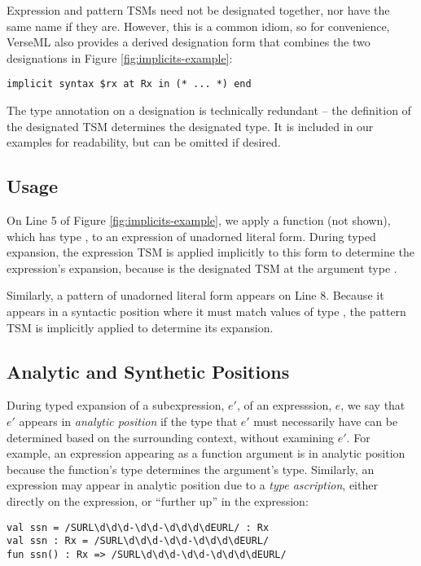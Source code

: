 Expression and pattern TSMs need not be designated together, nor have the same name if they are. However, this is a common idiom, so for convenience, VerseML also provides a derived designation form that combines the two designations in Figure \ref{fig:implicits-example}:
\begin{lstlisting}[numbers=none]
implicit syntax $rx at Rx in (* ... *) end 
\end{lstlisting}

The type annotation on a designation is technically redundant -- the definition of the designated TSM determines the designated type. It is included in our examples for readability, but can be omitted if desired.

\subsection{Usage}

On Line 5 of Figure \ref{fig:implicits-example}, we apply a function  (not shown), which has type , to an expression of unadorned literal form. During typed expansion, the expression TSM  is applied implicitly to this form to determine the expression's expansion,  because  is the designated TSM at the argument type . %

Similarly, a pattern of unadorned literal form appears on Line 8. Because it appears in a syntactic position where it must match values of type , the pattern TSM  is implicitly applied to determine its expansion.

\subsection{Analytic and Synthetic Positions}
During typed expansion of a subexpression, $e'$, of an expresssion, $e$, we say that $e'$ appears in \emph{analytic position} if the type that $e'$ must necessarily have can be determined based on the surrounding context, without examining $e'$. For example, an expression appearing as a function argument is in analytic position because the function's type determines the argument's type. Similarly, an expression may appear in analytic position due to a \emph{type ascription}, either directly on the expression, or ``further up'' in the expression:
\begin{lstlisting}[numbers=none]
val ssn = /SURL\d\d\d-\d\d-\d\d\d\dEURL/ : Rx
val ssn : Rx = /SURL\d\d\d-\d\d-\d\d\d\dEURL/
fun ssn() : Rx => /SURL\d\d\d-\d\d-\d\d\d\dEURL/
\end{lstlisting}

